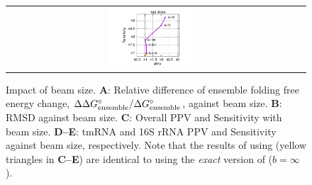 \begin{figure}[!h]
\begin{tabular}{c@{}c@{}c@{}c@{}c@{}c}
&
\hspace{-0cm}\raisebox{3.8cm}{\panel{E}} & 
\hspace{-1.5cm}\includegraphics[width=0.35\textwidth]{figs/precision-recall-16s-lpv-hzhang}
\vspace{-0.4cm}
\end{tabular}
\caption{
Impact of beam size. 
{\bf A}: Relative difference of 
  ensemble folding free energy change, $\Delta\Delta G^{\circ}_\text{ensemble}/\Delta G^\circ_\text{ensemble}$, against  beam size. %
{\bf B}: RMSD against beam size. %
{\bf C}: Overall PPV and Sensitivity with beam size.
{\bf D--E}: tmRNA and 16S rRNA PPV and Sensitivity against beam size, respectively. 
Note that the  results of \threshknot using \rnafold (yellow triangles in {\bf C--E}) are identical to \threshknot using
the {\em exact} version of \linearpartition ($b\!=\!\infty$).
\label{fig:beamsize}
\vspace{-0.7cm}
}
\end{figure}
